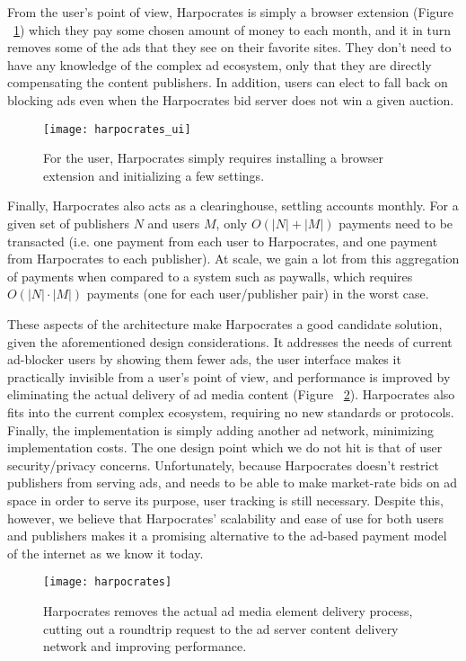 From the user's point of view, Harpocrates is simply a browser extension  (Figure ~\ref{fig:harpocrates_ui}) which they pay some chosen amount of money to each month, and it in turn removes some of the ads that they see on their favorite sites.
They don't need to have any knowledge of the complex ad ecosystem, only that they are directly compensating the content publishers.
In addition, users can elect to fall back on blocking ads even when the Harpocrates bid server does not win a given auction.

\begin{figure}[t]
\centering
\texttt{[image: harpocrates\_ui]}
\caption{For the user, Harpocrates simply requires installing a browser extension and initializing a few settings.}
\label{fig:harpocrates_ui}
\end{figure}

Finally, Harpocrates also acts as a clearinghouse, settling accounts monthly.
For a given set of publishers $N$ and users $M$, only $O(|N| + |M|)$ payments need to be transacted (i.e. one payment from each user to Harpocrates, and one payment from Harpocrates to each publisher).
At scale, we gain a lot from this aggregation of payments when compared to a system such as paywalls, which requires $O(|N| \cdot |M|)$ payments (one for each user/publisher pair) in the worst case.

These aspects of the architecture make Harpocrates a good candidate solution, given the aforementioned design considerations.
It addresses the needs of current ad-blocker users by showing them fewer ads, the user interface makes it practically invisible from a user's point of view, and performance is improved by eliminating the actual delivery of ad media content (Figure ~\ref{fig:harpocrates}).
Harpocrates also fits into the current complex ecosystem, requiring no new standards or protocols.
Finally, the implementation is simply adding another ad network, minimizing implementation costs.
The one design point which we do not hit is that of user security/privacy concerns.
Unfortunately, because Harpocrates doesn't restrict publishers from serving ads, and needs to be able to make market-rate bids on ad space in order to serve its purpose, user tracking is still necessary.
Despite this, however, we believe that Harpocrates' scalability and ease of use for both users and publishers makes it a promising alternative to the ad-based payment model of the internet as we know it today.

\begin{figure}[t]
\centering
\texttt{[image: harpocrates]}
\caption{Harpocrates removes the actual ad media element delivery process, cutting out a roundtrip request to the ad server content delivery network and improving performance.}
\label{fig:harpocrates}
\end{figure}

